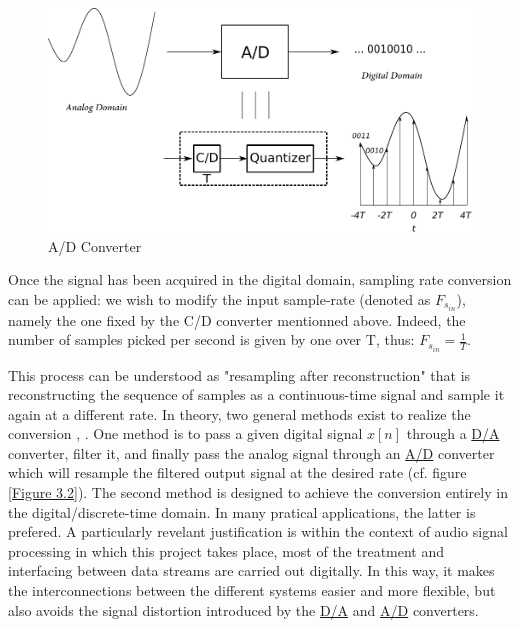 \begin{figure}[th]
	\centering
	\includegraphics[scale = 0.8]{atod.pdf}
	\decoRule
	\caption{A/D Converter}\label{Figure 3.1}
\end{figure}

\newpage

Once the signal has been acquired in the digital domain, sampling rate conversion can be applied: we wish to modify the input sample-rate (denoted as $ F_{s_{in}} $), namely the one fixed by the C/D converter mentionned above. Indeed, the number of samples picked per second is given by one over T, thus: $ F_{s_{in}} = \frac{1}{T}$. 

This process can be understood as "resampling after reconstruction" \cite{Proakis} that is reconstructing the sequence of samples as a continuous-time signal and sample it again at a different rate. In theory, two general methods exist to realize the conversion \cite{Proakis}, \cite{Oppenheim}. One method is to pass a given digital signal $x[n]$ %
 through a \hyperlink{D/A}{D/A} converter, filter it, and finally pass the analog signal through an \hyperlink{A/D}{A/D} converter which will resample the filtered output signal at the desired rate (cf. figure \ref{Figure 3.2}). The second method is designed to achieve the conversion entirely in the digital/discrete-time domain. In many pratical applications, the latter is prefered. A particularly revelant justification is within the context of audio signal processing in which this project takes place, most of the treatment and interfacing between data streams are carried out digitally. In this way, it makes the interconnections between the different systems easier and more flexible, but also avoids the signal distortion introduced by the \hyperlink{D/A}{D/A} and \hyperlink{A/D}{A/D} converters. 


